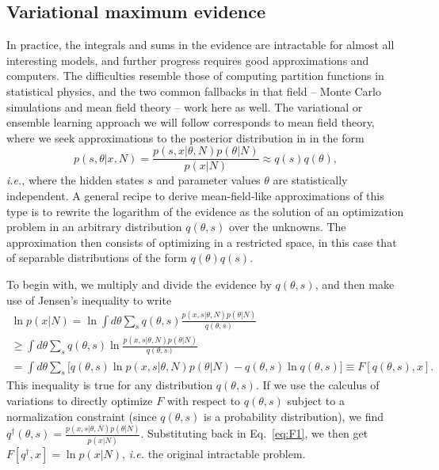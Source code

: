
\subsection{Variational maximum evidence}
In practice, the integrals and sums in the evidence are intractable
for almost all interesting models, and further progress requires good
approximations and computers. The difficulties resemble those of
computing partition functions in statistical physics, and the two
common fallbacks in that field -- Monte Carlo
simulations \cite{Green1995,Robert2000,Mackay2003} and mean field
theory \cite{Mackay1997,Mackay2003,Bishop2006} -- work here as well.
The variational or ensemble learning approach we will follow corresponds to
mean field theory, where we seek approximations to the
posterior distribution in  in the form
\begin{equation}
p(s,\theta|x,N)=\frac{p(s,x|\theta,N)p(\theta|N)}{p(x|N)}
\approx q(s)q(\theta),
\end{equation}
\textit{i.e.}, where the hidden states $s$ and parameter values $\theta$ are
statistically independent.  A general recipe to derive mean-field-like
approximations of this type\cite{Mackay2003} is to rewrite the
logarithm of the evidence as the solution of an optimization problem
in an arbitrary distribution $q(\theta,s)$ over the unknowns. The
approximation then consists of optimizing in a restricted space, in
this case that of separable distributions of the form $q(\theta)q(s)$.

To begin with, we multiply and divide the evidence by $q(\theta,s)$,
and then make use of Jensen's inequality to write
\begin{multline}\label{eq:F1}
\ln p(x|N)=\ln \int d\theta\sum_s 
    q(\theta,s)\frac{p(x,s|\theta,N)p(\theta|N)}{q(\theta,s)}\\
    \ge \int d\theta\sum_s q(\theta,s) 
    \ln \frac{p(x,s|\theta,N)p(\theta|N)}{q(\theta,s)}\\
    =\int d\theta\sum_s \Big[
    q(\theta,s) \ln p(x,s|\theta,N)p(\theta|N)
    -q(\theta,s) \ln q(\theta,s)
    \Big]\equiv F[q(\theta,s),x].
\end{multline}
This inequality is true for any distribution $q(\theta,s)$. If we use
the calculus of variations to directly optimize $F$ with respect to
$q(\theta,s)$ subject to a normalization constraint (since
$q(\theta,s)$ is a probability distribution), we find
$q^\dagger(\theta,s)=\frac{p(x,s|\theta,N)p(\theta|N)}{p(x|N)}$. Substituting
back in Eq.~\eqref{eq:F1}, we then get $F[q^\dagger,x]=\ln
p(x|N)$, \textit{i.e.} the original intractable problem.

